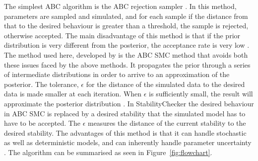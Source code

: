 The simplest ABC algorithm is the ABC rejection sampler \autocite{Pritchard:1999td}. In this method, parameters are sampled and simulated, and for each sample if the distance from that to the desired behaviour is greater than a threshold, the sample is rejected, otherwise accepted. The main disadvantage of this method is that if the prior distribution is very different from the posterior, the acceptance rate is very low \autocite{Toni:2009tr}. %
 The method used here, developed by \textcite{Toni:2009tr} is the ABC SMC method that avoids both these issues faced by the above methods. It propagates the prior through a series of intermediate distributions in order to arrive to an approximation of the posterior. The tolerance, $\epsilon$ for the distance of the simulated data to the desired data is made smaller at each iteration. When $\epsilon$ is sufficiently small, the result will approximate the posterior distribution \autocite{Toni:2009tr}. 
In StabilityChecker the desired behaviour in ABC SMC is replaced by a desired stability that the simulated model has to have to be accepted. The $\epsilon$ measures the distance of the current stability to the desired stability. The advantages of this method is that it can handle stochastic as well as deterministic models, and can inherently handle parameter uncertainty \autocite{Barnes:2011hh}. The algorithm can be summarised as seen in Figure~\ref{fig:flowchart}.
\clearpage
